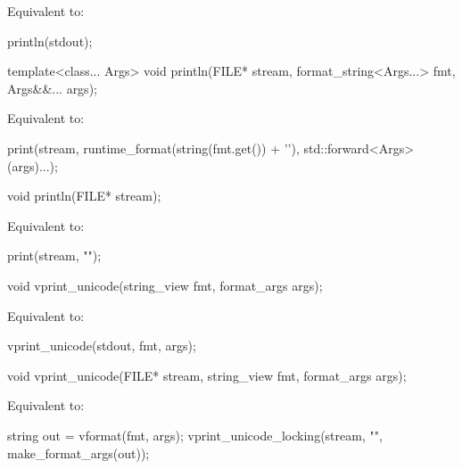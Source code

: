 \begin{itemdescr}
\pnum
\effects
Equivalent to:
\begin{codeblock}
println(stdout);
\end{codeblock}
\end{itemdescr}

%
\begin{itemdecl}
template<class... Args>
  void println(FILE* stream, format_string<Args...> fmt, Args&&... args);
\end{itemdecl}

\begin{itemdescr}
\pnum
\effects
Equivalent to:
\begin{codeblock}
print(stream, runtime_format(string(fmt.get()) + '\n'), std::forward<Args>(args)...);
\end{codeblock}
\end{itemdescr}

%
\begin{itemdecl}
void println(FILE* stream);
\end{itemdecl}

\begin{itemdescr}
\pnum
\effects
Equivalent to:
\begin{codeblock}
print(stream, "\n");
\end{codeblock}
\end{itemdescr}

%
\begin{itemdecl}
void vprint_unicode(string_view fmt, format_args args);
\end{itemdecl}

\begin{itemdescr}
\pnum
\effects
Equivalent to:
\begin{codeblock}
vprint_unicode(stdout, fmt, args);
\end{codeblock}
\end{itemdescr}

%
\begin{itemdecl}
void vprint_unicode(FILE* stream, string_view fmt, format_args args);
\end{itemdecl}

\begin{itemdescr}
\pnum
\effects
Equivalent to:
\begin{codeblock}
string out = vformat(fmt, args);
vprint_unicode_locking(stream, "{}", make_format_args(out));
\end{codeblock}
\end{itemdescr}

